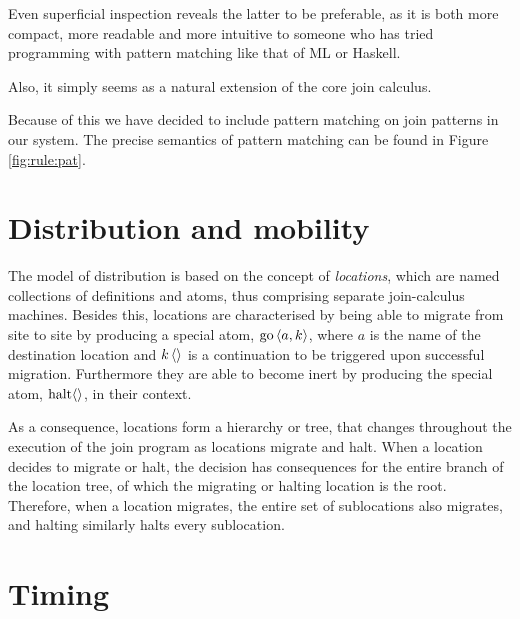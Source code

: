 Even superficial inspection reveals the latter to be preferable, as it is both
more compact, more readable and more intuitive to someone who has tried
programming with pattern matching like that of ML or Haskell.

Also, it simply seems as a natural extension of the core join calculus.

Because of this we have decided to include pattern matching on join patterns in our system.
The precise semantics of pattern matching can be found in Figure \ref{fig:rule:pat}.

\section{Distribution and mobility}
The model of distribution is based on the concept of \emph{locations}, which
are named collections of definitions and atoms, thus comprising separate
join-calculus machines. Besides this, locations are characterised by being able
to migrate from site to site by producing a special atom, $\Go<a,k>$, where $a$
is the name of the destination location and $\atm k <>$ is a continuation to be
triggered upon successful migration. Furthermore they are able to become inert
by producing the special atom, $\Halt<>$, in their context.

As a consequence, locations form a hierarchy or tree, that changes throughout
the execution of the join program as locations migrate and halt.
When a location decides to migrate or halt, the decision has consequences for
the entire branch of the location tree, of which the migrating or halting
location is the root. Therefore, when a location migrates, the entire set of
sublocations also migrates, and halting similarly halts every sublocation.

\section{Timing}

